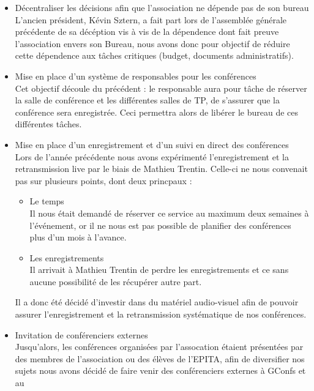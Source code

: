 \documentclass[12pt]{report}
\begin{document}
  \begin{itemize}
    \item
      Décentraliser les décisions afin que l'association ne dépende pas de son
      bureau\\ L'ancien président, Kévin Sztern, a fait part lors de l'assemblée
      générale précédente de sa décéption vis à vis de la dépendence dont fait
      preuve l'association envers son Bureau, nous avons donc pour objectif de
      réduire cette dépendence aux tâches critiques (budget, documents
      administratifs).
    \item
      Mise en place d'un système de responsables pour les conférences\\ Cet
      objectif découle du précédent : le responsable aura pour tâche de réserver
      la salle de conférence et les différentes salles de TP, de s'assurer que
      la conférence sera enregistrée.  Ceci permettra alors de libérer le bureau
      de ces différentes tâches.
    \item
      Mise en place d'un enregistrement et d'un suivi en direct des
      conférences\\ Lors de l'année précédente nous avons expérimenté
      l'enregistrement et la retransmission live par le biais de Mathieu
      Trentin. Celle-ci ne nous convenait pas sur plusieurs points, dont deux
      princpaux :
      \begin{itemize}
        \item
          Le temps \\ Il nous était demandé de réserver ce service au maximum
          deux semaines à l'événement, or il ne nous est pas possible de
          planifier des conférences plus d'un mois à l'avance.
        \item
          Les enregistrements \\ Il arrivait à Mathieu Trentin de perdre les
          enregistrements et ce sans aucune possibilité de les récupérer autre
          part.
      \end{itemize}
      Il a donc été décidé d'investir dans du matériel audio-visuel afin de
      pouvoir assurer l'enregistrement et la retransmission systématique de nos
      conférences.
    \item
      Invitation de conférenciers externes\\ Jusqu'alors, les conférences
      organisées par l'assocation étaient présentées par des membres de
      l'association ou des élèves de l'EPITA, afin de diversifier nos sujets
      nous avons décidé de faire venir des conférenciers externes à GConfs et au

\end{itemize}
\end{document}
